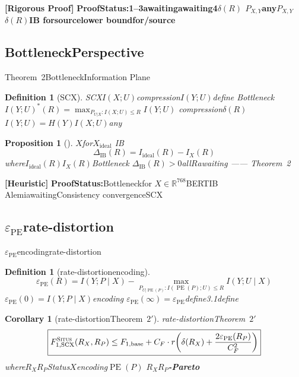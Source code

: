 \documentclass[11pt,a4paper]{article}
\newtheorem{proposition}[theorem]{Proposition}
\newtheorem{corollary}[theorem]{Corollary}
\newtheorem{definition}[theorem]{Definition}
\theoremstyle{remark}
\DeclareMathOperator{\PE}{PE}
\newcommand{\R}{\mathbb{R}}
\newcommand{\Situs}{\textsc{Situs}}
\newcommand{\rigorous}{\textnormal{\textbf{[Rigorous Proof]}}}
\newcommand{\heuristic}{\textnormal{\textbf{[Heuristic]}}}
\begin{document}
\rigorous{} \textbf{ProofStatus:1--3awaitingawaiting4$\delta(R)$
$P_{X,Y}$any$P_{X,Y}$$\delta(R)$IB
forsourcelower boundfor/source}

\subsection{BottleneckPerspective}

Theorem~2BottleneckInformation Plane

\begin{definition}[SCX]
\label{def:info_plane}
SCX$I(X; U)$compression$I(Y; U)$define
Bottleneck$I(Y; U)^*(R) = \max_{P_{U|X}: I(X;U) \leq R} I(Y; U)$
compression$\delta(R)$
$I(Y; U) = H(Y)$$I(X; U)$any\textbf{}
\end{definition}

\begin{proposition}[]
\label{prop:weak_feature_info_plane}
$X$for$X_{\text{ideal}}$
IB\textbf{}
\begin{equation}
    \boxed{\Delta_{\text{IB}}(R) = I_{\text{ideal}}(R) - I_X(R)}
\end{equation}
where$I_{\text{ideal}}(R)$$I_X(R)$Bottleneck
$\Delta_{\text{IB}}(R) > 0$all$R$awaiting
\textbf{}——
Theorem~2
\end{proposition}

\heuristic{} \textbf{ProofStatus:}Bottleneckfor
$X \in \R^{768}$BERTIB
Alemiawaiting\cite{alemi2017deep_ib}Consistency
convergenceSCX

\subsection{$\varepsilon_{\PE}$rate-distortion}

$\varepsilon_{\PE}$encodingrate-distortion

\begin{definition}[rate-distortionencoding]
\label{def:epsilon_rdt}
\begin{equation}
    \boxed{\varepsilon_{\PE}(R) = I(Y; P \mid X) - \max_{P_{U|\PE(P)}: I(\PE(P);U) \leq R} I(Y; U \mid X)}
\end{equation}
$\varepsilon_{\PE}(0) = I(Y; P \mid X)$encoding
$\varepsilon_{\PE}(\infty) = \varepsilon_{\PE}$define3.1define
\end{definition}

\begin{corollary}[rate-distortionTheorem~$2'$]
\label{cor:thm2prime_rdt}
rate-distortionTheorem~$2'$
\begin{equation}
    \boxed{F_{1,\text{SCX}}^{\Situs}(R_X, R_P) \leq F_{1,\text{base}}
    + C_F \cdot r\!\left(\delta(R_X) + \frac{2\varepsilon_{\PE}(R_P)}{C_F^2}\right)}
\end{equation}
where$R_X$$R_P$Status$X$encoding$\PE(P)$
$R_X$$R_P$\textbf{-Pareto}
\end{corollary}
\end{document}
